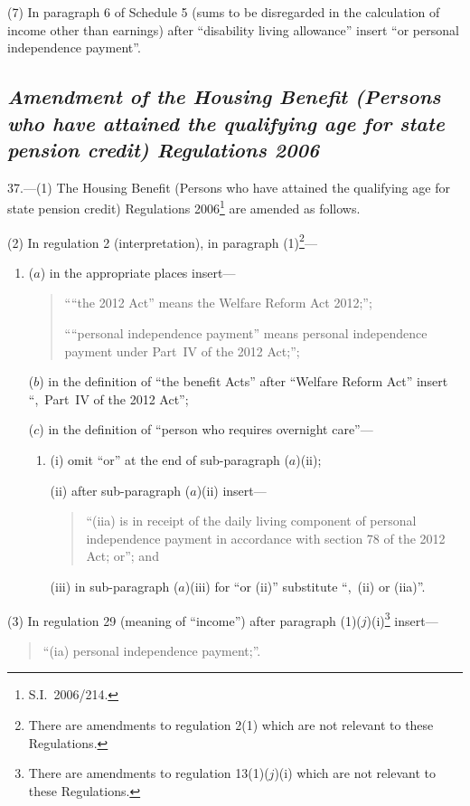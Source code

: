 \documentclass[12pt,a4paper]{article}
\begin{document}
(7) In paragraph 6 of Schedule 5 (sums to be disregarded in the calculation of income other than earnings) after “disability living allowance” insert “or personal independence payment”.

\subsection*{\itshape Amendment of the Housing Benefit (Persons who have attained the qualifying age for state pension credit) Regulations 2006}

37.—(1) The Housing Benefit (Persons who have attained the qualifying age for state pension credit) Regulations 2006\footnote{S.I.~2006/214.} are amended as follows.

(2) In regulation 2 (interpretation), in paragraph (1)\footnote{There are amendments to regulation 2(1) which are not relevant to these Regulations.}—
\begin{enumerate}\item[]
($a$) in the appropriate places insert—
\begin{quotation}
““the 2012 Act” means the Welfare Reform Act 2012;”;

““personal independence payment” means personal independence payment under Part~IV of the 2012 Act;”;
\end{quotation}

($b$) in the definition of “the benefit Acts” after “Welfare Reform Act” insert “,~Part~IV of the 2012 Act”;

($c$) in the definition of “person who requires overnight care”—
\begin{enumerate}\item[]
(i) omit “or” at the end of sub-paragraph ($a$)(ii);

(ii) after sub-paragraph ($a$)(ii)  insert—
\begin{quotation}
“(iia) is in receipt of the daily living component of personal independence payment in accordance with section 78 of the 2012 Act; or”; and
\end{quotation}

(iii) in sub-paragraph ($a$)(iii)  for “or (ii)” substitute “,~(ii)  or (iia)”.
\end{enumerate}
\end{enumerate}

(3) In regulation 29 (meaning of “income”) after paragraph (1)($j$)(i)\footnote{There are amendments to regulation 13(1)($j$)(i)  which are not relevant to these Regulations.} insert—
\begin{quotation}
“(ia) personal independence payment;”.
\end{quotation}
\end{document}
